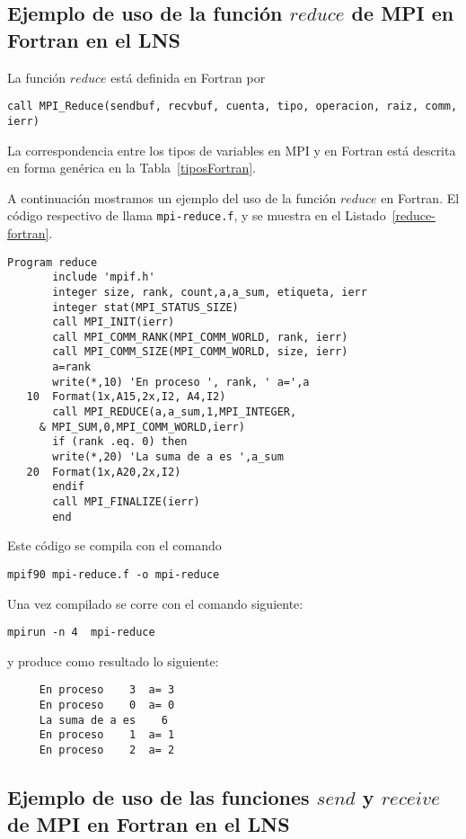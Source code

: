 \documentclass[letter]{jpconf}
\begin{document}
\subsection{Ejemplo de uso de la funci\'on $reduce$ de MPI en Fortran en el LNS}

La funci\'on $reduce$ est\'a definida en Fortran por
\color{black}
\begin{verbatim}
call MPI_Reduce(sendbuf, recvbuf, cuenta, tipo, operacion, raiz, comm, ierr) 
\end{verbatim}
\color{black}
La correspondencia entre los tipos de variables en MPI y en Fortran est\'a descrita en forma gen\'erica en la Tabla~\ref{tiposFortran}.

A continuaci\'on mostramos un ejemplo del uso de la funci\'on $reduce$ en Fortran. El c\'odigo respectivo de llama  \texttt{mpi-reduce.f},  y se muestra en el Listado~\ref{reduce-fortran}.
\begin{lstlisting}[float,floatplacement=H,label=reduce-fortran,caption=Listado del programa  \texttt{mpi-reduce.f} en Fortran]
       Program reduce
       include 'mpif.h'
       integer size, rank, count,a,a_sum, etiqueta, ierr
       integer stat(MPI_STATUS_SIZE)   
       call MPI_INIT(ierr)
       call MPI_COMM_RANK(MPI_COMM_WORLD, rank, ierr)
       call MPI_COMM_SIZE(MPI_COMM_WORLD, size, ierr)
       a=rank
       write(*,10) 'En proceso ', rank, ' a=',a
   10  Format(1x,A15,2x,I2, A4,I2)
       call MPI_REDUCE(a,a_sum,1,MPI_INTEGER,
     & MPI_SUM,0,MPI_COMM_WORLD,ierr)
       if (rank .eq. 0) then
       write(*,20) 'La suma de a es ',a_sum
   20  Format(1x,A20,2x,I2)
       endif
       call MPI_FINALIZE(ierr)
       end
 \end{lstlisting}


Este c\'odigo se compila con el comando
\color{blue}
\begin{verbatim}
mpif90 mpi-reduce.f -o mpi-reduce
\end{verbatim}
\color{black}
Una vez compilado se corre con el comando siguiente:
\color{blue}
\begin{verbatim}
mpirun -n 4  mpi-reduce
\end{verbatim}
\color{black}
y produce como resultado lo siguiente:
\color{brown}
\begin{verbatim}
     En proceso    3  a= 3
     En proceso    0  a= 0
     La suma de a es    6
     En proceso    1  a= 1
     En proceso    2  a= 2
 \end{verbatim}
\color{black}


\subsection{Ejemplo de uso de las funciones $send$ y $receive$ de MPI en Fortran en el LNS}
\end{document}
